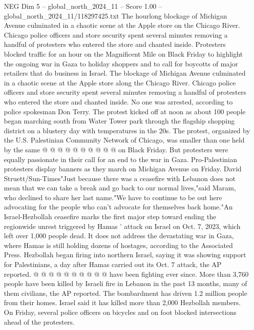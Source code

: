 \begin{textsample}{NEG Dim 5 – global\_north\_2024\_11 – Score 1.00 – global\_north\_2024\_11/118297425.txt}  \label{ex:f5_neg_420}
The hourlong blockage of Michigan Avenue culminated in a chaotic scene at the Apple store on the Chicago River.
Chicago police officers and store security spent several minutes removing a handful of protesters who entered the store and chanted inside.
Protesters blocked traffic for an hour on the Magnificent Mile on Black Friday to highlight the ongoing war in Gaza to holiday shoppers and to call for boycotts of major retailers that do business in Israel.
The blockage of Michigan Avenue culminated in a chaotic scene at the Apple store along the Chicago River.
Chicago police officers and store security spent several minutes removing a handful of protesters who entered the store and chanted inside.
No one was arrested, according to police spokesman Don Terry.
The protest kicked off at noon as about 100 people began marching south from Water Tower park through the flagship shopping district on a blustery day with temperatures in the 20s.
The protest, organized by the U.S.
Palestinian Community Network of Chicago, was smaller than one held by the same @ @ @ @ @ @ @ @ @ @ on Black Friday.
But protesters were equally passionate in their call for an end to the war in Gaza.
Pro-Palestinian protesters display banners as they march on Michigan Avenue on Friday.
David Struett/Sun-Times"Just because there was a ceasefire with Lebanon does not mean that we can take a break and go back to our normal lives,"said Maram, who declined to share her last name."We have to continue to be out here advocating for the people who can't advocate for themselves back home."An Israel-Hezbollah ceasefire marks the first major step toward ending the regionwide unrest triggered by Hamas ' attack on Israel on Oct. 7, 2023, which left over 1,000 people dead.
It does not address the devastating war in Gaza, where Hamas is still holding dozens of hostages, according to the Associated Press.
Hezbollah began firing into northern Israel, saying it was showing support for Palestinians, a day after Hamas carried out its Oct. 7 attack, the AP reported. @ @ @ @ @ @ @ @ @ @ have been fighting ever since.
More than 3,760 people have been killed by Israeli fire in Lebanon in the past 13 months, many of them civilians, the AP reported.
The bombardment has driven 1.2 million people from their homes.
Israel said it has killed more than 2,000 Hezbollah members.
On Friday, several police officers on bicycles and on foot blocked intersections ahead of the protesters.

\end{textsample}
